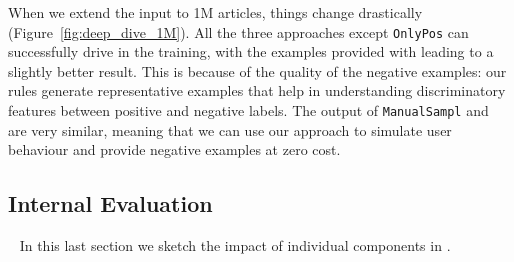 When we extend the input to 1M articles, things change drastically (Figure~\ref{fig:deep_dive_1M}). All the three approaches except \texttt{OnlyPos} can successfully drive \deepdive in the training, with the examples provided with \krd leading to a slightly better result. This is because of the quality of the negative examples: our rules generate representative examples that help \deepdive in understanding discriminatory features between positive and negative labels.
The output of \texttt{ManualSampl} and \krd are very similar, meaning that we can use our approach to simulate user behaviour and provide negative examples at zero cost. 

\subsection{Internal Evaluation} ~\label{sec:krd_int_evaluation}
In this last section we sketch the impact of individual components in \krd.

